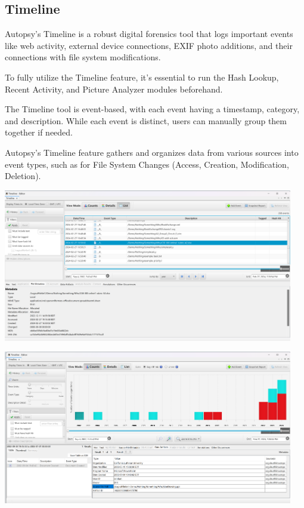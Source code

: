 \documentclass{article}
\begin{document}
\subsection{Timeline}

Autopsy's Timeline is a robust digital forensics tool that logs important events like web activity, external device connections, EXIF photo additions, and their connections with file system modifications.

To fully utilize the Timeline feature, it's essential to run the Hash Lookup, Recent Activity, and Picture Analyzer modules beforehand.

The Timeline tool is event-based, with each event having a timestamp, category, and description. While each event is distinct, users can manually group them together if needed.

Autopsy's Timeline feature gathers and organizes data from various sources into event types, such as for File System Changes (Access, Creation, Modification, Deletion).

\begin{center}
    \includegraphics[width=0.95\textwidth]{4/4.2/Timeline View-1.png}
\end{center}

\begin{center}
    \includegraphics[width=0.95\textwidth]{4/4.2/Timeline View-2.png}
\end{center}
\end{document}
